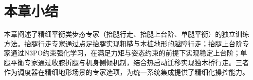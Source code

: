 \section{本章小结}

本章阐述了精细平衡类步态专家（抬腿行走、抬腿上台阶、单腿平衡）的独立训练方法。抬腿行走专家通过点足抬腿实现粗糙与木桩地形的越障行走；抬腿上台阶专家通过N3PO约束强化学习，在满足力矩与姿态约束的前提下实现稳定上台阶；单腿平衡专家通过收膝折腿与机身侧倾机制，结合热启动迁移实现独木桥行走。三者作为调度器在精细地形场景的专家选项，为统一系统集成提供了精细化操控能力。
